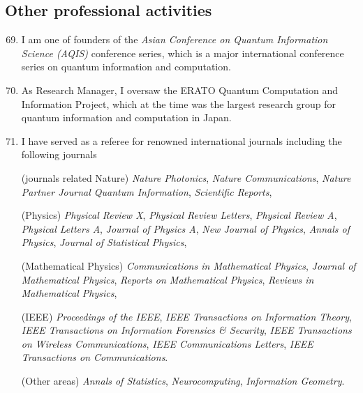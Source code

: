 \subsection{Other professional activities}
\begin{enumerate}
\setcounter{enumi}{68}
\item I am one of founders of the
{\em Asian Conference on Quantum Information Science (AQIS)} conference series, which is a major international conference series on quantum information and computation.


\item As Research Manager, I oversaw the ERATO Quantum Computation and Information Project, 
which at the time was the largest research group for quantum information and computation in Japan. 

\item I have served as a referee for 
renowned international journals 
including the following journals

(journals related Nature)
\textit{Nature Photonics}, 
\textit{Nature Communications}, 
\textit{Nature Partner Journal Quantum Information}, 
\textit{Scientific Reports},

(Physics) \textit{Physical Review X}, 
\textit{Physical Review Letters}, 
\textit{Physical Review A}, 
\textit{Physical Letters A}, 
\textit{Journal of Physics A},
\textit{New Journal of Physics},
\textit{Annals of Physics},
\textit{Journal of Statistical Physics},

(Mathematical Physics)
\textit{Communications in Mathematical Physics}, 
\textit{Journal of Mathematical Physics},
\textit{Reports on Mathematical Physics},
\textit{Reviews in Mathematical Physics},

(IEEE)
\textit{Proceedings of the IEEE},
\textit{IEEE Transactions on Information Theory}, 
\textit{IEEE Transactions on Information Forensics \& Security},
\textit{IEEE Transactions on Wireless Communications},
\textit{IEEE Communications Letters},
\textit{IEEE Transactions on Communications}.

(Other areas)
\textit{Annals of Statistics},
\textit{Neurocomputing},
\textit{Information Geometry}.

\end{enumerate}





